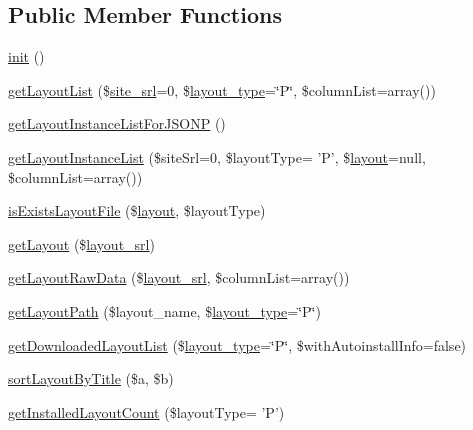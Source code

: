 \subsection*{Public Member Functions}
\begin{DoxyCompactItemize}
\item 
\hyperlink{classlayoutModel_a0e38b226e6c6f4ceae728725e40178fd}{init} ()
\item 
\hyperlink{classlayoutModel_afc353a7801c6cd15af3822e6fdac9ba2}{get\+Layout\+List} (\$\hyperlink{ko_8install_8php_a8b1406b4ad1048041558dce6bfe89004}{site\+\_\+srl}=0, \$\hyperlink{ko_8install_8php_a0532d89570cfdaebc628afac2ff5a81b}{layout\+\_\+type}=\char`\"{}P\char`\"{}, \$column\+List=array())
\item 
\hyperlink{classlayoutModel_a8093366d9ab2988d5ae6d51856752f91}{get\+Layout\+Instance\+List\+For\+J\+S\+O\+N\+P} ()
\item 
\hyperlink{classlayoutModel_a4cd0c42496b7529d53835669eb4798c5}{get\+Layout\+Instance\+List} (\$site\+Srl=0, \$layout\+Type= 'P', \$\hyperlink{classlayout}{layout}=null, \$column\+List=array())
\item 
\hyperlink{classlayoutModel_aad01da0a48d593382de1d46df2c6d2c2}{is\+Exists\+Layout\+File} (\$\hyperlink{classlayout}{layout}, \$layout\+Type)
\item 
\hyperlink{classlayoutModel_a46f845328e6b65e772408ceb990adb6b}{get\+Layout} (\$\hyperlink{ko_8install_8php_a70054876db09b2519a1726663c8dd9e7}{layout\+\_\+srl})
\item 
\hyperlink{classlayoutModel_a008cf11689e020eb48ac719eb33979a6}{get\+Layout\+Raw\+Data} (\$\hyperlink{ko_8install_8php_a70054876db09b2519a1726663c8dd9e7}{layout\+\_\+srl}, \$column\+List=array())
\item 
\hyperlink{classlayoutModel_a623568fac8ced4bb39cf0d181e8dd4ff}{get\+Layout\+Path} (\$layout\+\_\+name, \$\hyperlink{ko_8install_8php_a0532d89570cfdaebc628afac2ff5a81b}{layout\+\_\+type}=\char`\"{}P\char`\"{})
\item 
\hyperlink{classlayoutModel_aed10488985735bd1adda014388b3a781}{get\+Downloaded\+Layout\+List} (\$\hyperlink{ko_8install_8php_a0532d89570cfdaebc628afac2ff5a81b}{layout\+\_\+type}=\char`\"{}P\char`\"{}, \$with\+Autoinstall\+Info=false)
\item 
\hyperlink{classlayoutModel_a2fe5cbdc4be434f56cc1fed03588d1f4}{sort\+Layout\+By\+Title} (\$a, \$b)
\item 
\hyperlink{classlayoutModel_a0d0b74697a88270380a7f7afac1af96b}{get\+Installed\+Layout\+Count} (\$layout\+Type= 'P')

\end{DoxyCompactItemize}

